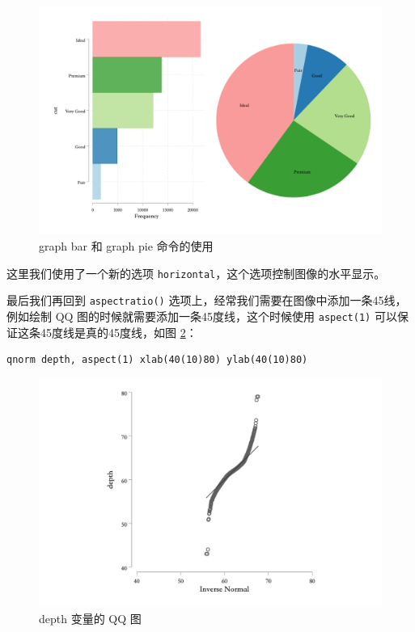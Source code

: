 \begin{figure}[htbp]
  \centering \includegraphics[width=\textwidth]{assets/barpluspie.png}
  \caption{graph bar 和 graph pie 命令的使用}\label{fig:barpluspie}
\end{figure}

这里我们使用了一个新的选项 \texttt{horizontal}，这个选项控制图像的水平显示。

最后我们再回到 \texttt{aspectratio()} 选项上，经常我们需要在图像中添加一条45线，例如绘制 QQ 图的时候就需要添加一条45度线，这个时候使用 \texttt{aspect(1)} 可以保证这条45度线是真的45度线，如图 \ref{fig:qnorm}：

\begin{lstlisting}
qnorm depth, aspect(1) xlab(40(10)80) ylab(40(10)80)
\end{lstlisting}

\begin{figure}[htbp]
  \centering \includegraphics[width=\textwidth]{assets/qnorm.png}
  \caption{depth 变量的 QQ 图}\label{fig:qnorm}
\end{figure}
